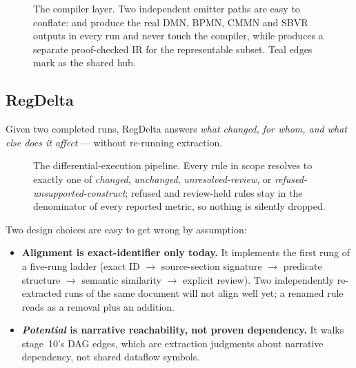 \documentclass[11pt]{article}
\begin{document}
\begin{figure}[htbp]
  \centering
  \resizebox{\linewidth}{!}{}
  \caption{The compiler layer. Two independent emitter paths are easy to
    conflate:  and 
    produce the real DMN, BPMN, CMMN and SBVR outputs in every run and
    never touch the compiler, while  produces a
    separate proof-checked IR for the representable subset. Teal edges mark
     as the shared hub.}
  \label{fig:modules}
\end{figure}

\subsection{RegDelta}

Given two completed runs, RegDelta answers \emph{what changed, for whom,
and what else does it affect} --- without re-running extraction.

\begin{figure}[htbp]
  \centering
  \resizebox{\linewidth}{!}{}
  \caption{The differential-execution pipeline. Every rule in scope
    resolves to exactly one of \emph{changed}, \emph{unchanged},
    \emph{unresolved-review}, or \emph{refused-unsupported-construct};
    refused and review-held rules stay in the denominator of every reported
    metric, so nothing is silently dropped.}
  \label{fig:regdelta}
\end{figure}

Two design choices are easy to get wrong by assumption:

\begin{itemize}
  \item \textbf{Alignment is exact-identifier only today.} It implements
    the first rung of a five-rung ladder (exact ID $\to$ source-section
    signature $\to$ predicate structure $\to$ semantic similarity $\to$
    explicit review). Two independently re-extracted runs of the same
    document will not align well yet; a renamed rule reads as a removal
    plus an addition.
  \item \textbf{\emph{Potential} is narrative reachability, not proven
    dependency.} It walks stage~10's DAG edges, which are extraction
    judgments about narrative dependency, not shared dataflow symbols.
\end{itemize}

\end{document}
